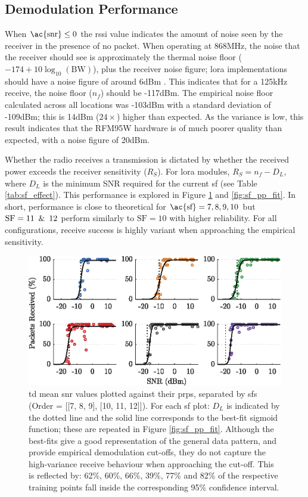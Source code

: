 \subsection{Demodulation Performance}\label{sec:demodulation_performance}
When $\text{\ac{snr}} \leq 0$ the \ac{rssi} value indicates the amount of noise seen by the receiver in the presence of no packet. When operating at 868MHz, the noise that the receiver should see is approximately the thermal noise floor ($-174+10 \log_{10}(\text{BW})$), plus the receiver noise figure; \ac{lora} implementations should have a noise figure of around 6dBm \cite{3YP:LORA_MOD_BASICS}. This indicates that for a 125kHz receive, the noise floor ($n_f$) should be -117dBm. The empirical noise floor calculated across all locations was -103dBm with a standard deviation of -109dBm; this is 14dBm ($24\times$) higher than expected. As the variance is low, this result indicates that the RFM95W hardware is of much poorer quality than expected, with a noise figure of 20dBm.

Whether the radio receives a transmission is dictated by whether the received power exceeds the receiver sensitivity ($R_S$). For \ac{lora} modules, $R_S = n_f - D_L$, where $D_L$ is the minimum SNR required for the current \ac{sf} (see Table \ref{tab:sf_effect}). This performance is explored in Figure \ref{fig:sf_pp_separate} and \ref{fig:sf_pp_fit}. In short, performance is close to theoretical for $\text{\ac{sf}} = 7, 8, 9, 10$ but $\text{SF}=11\enskip \& \enskip 12$ perform similarly to $\text{SF}=10$ with higher reliability. For all configurations, receive success is highly variant when approaching the empirical sensitivity.

\begin{figure}[H]
    \centering
   	\includegraphics{Figures/sf_pp_separate_plot}
    \caption[Plots of \ac{snr} vs \ac{prp}]{
   \ac{td} mean \ac{snr} values plotted against their \ac{prp}s, separated by \ac{sf}s (Order = [[7, 8, 9], [10, 11, 12]]). For each \ac{sf} plot: $D_L$ is indicated by the dotted line and the solid line corresponds to the best-fit sigmoid function; these are repeated in Figure \ref{fig:sf_pp_fit}. Although the best-fits give a good representation of the general data pattern, and provide empirical demodulation cut-offs, they do not capture the high-variance receive behaviour when approaching the cut-off. This is reflected by: 62\%, 60\%, 66\%, 39\%, 77\% and 82\% of the respective training points fall inside the corresponding 95\% confidence interval.
    }
    \label{fig:sf_pp_separate}
\end{figure}

